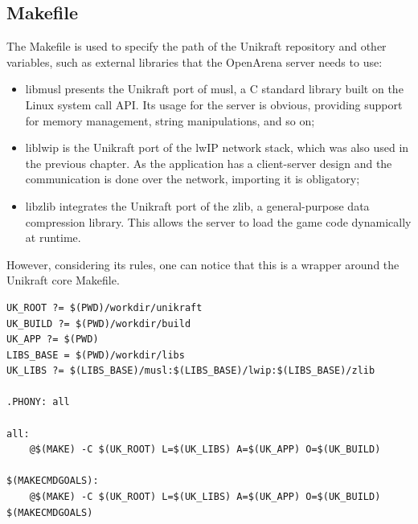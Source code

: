 \subsection{Makefile}
The Makefile is used to specify the path of the Unikraft repository and other variables, such as external libraries that the OpenArena server needs to use:
\begin{itemize}
    \item libmusl presents the Unikraft port of musl\cite{musl-libc}, a C standard library built on the Linux system call API.
    Its usage for the server is obvious, providing support for memory management, string manipulations, and so on;
    \item liblwip is the Unikraft port of the lwIP network stack, which was also used in the previous chapter.
    As the application has a client-server design and the communication is done over the network, importing it is obligatory;
    \item libzlib integrates the Unikraft port of the zlib\cite{zlib-github}, a general-purpose data compression library.
    This allows the server to load the game code dynamically at runtime.
\end{itemize}
However, considering its rules, one can notice that this is a wrapper around the Unikraft core Makefile.
\\
\lstset{basicstyle=\small\ttfamily, caption=Makefile, language=make}
\begin{lstlisting}
UK_ROOT ?= $(PWD)/workdir/unikraft
UK_BUILD ?= $(PWD)/workdir/build
UK_APP ?= $(PWD)
LIBS_BASE = $(PWD)/workdir/libs
UK_LIBS ?= $(LIBS_BASE)/musl:$(LIBS_BASE)/lwip:$(LIBS_BASE)/zlib

.PHONY: all

all:
	@$(MAKE) -C $(UK_ROOT) L=$(UK_LIBS) A=$(UK_APP) O=$(UK_BUILD)

$(MAKECMDGOALS):
	@$(MAKE) -C $(UK_ROOT) L=$(UK_LIBS) A=$(UK_APP) O=$(UK_BUILD) $(MAKECMDGOALS)
\end{lstlisting}
\\
